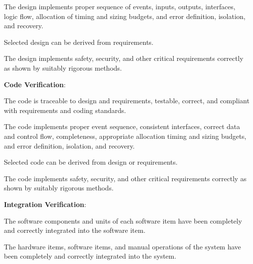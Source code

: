 \begin{adjustwidth}{2em}{0pt}
\begin{compactenum}
\begin{compactenum}
						\item The design implements proper sequence of events, inputs, outputs, interfaces, logic flow, allocation of timing and sizing budgets, and error definition, isolation, and recovery.

						\item Selected design can be derived from requirements.

						\item The design implements safety, security, and other critical requirements correctly as shown by suitably rigorous methods.

					\end{compactenum}

					\item {\bf Code Verification}:

					\begin{compactenum}

						\item The code is traceable to design and requirements, testable, correct, and compliant with requirements and coding standards.

						\item The code implements proper event sequence, consistent interfaces, correct data and control flow, completeness, appropriate allocation timing and sizing budgets, and error definition, isolation, and recovery.

						\item Selected code can be derived from design or requirements.

						\item The code implements safety, security, and other critical requirements correctly as shown by suitably rigorous methods.

					\end{compactenum}

					\item {\bf Integration Verification}:

					\begin{compactenum}

						\item The software components and units of each software item have been completely and correctly integrated into the software item.

						\item The hardware items, software items, and manual operations of the system have been completely and correctly integrated into the system.


\end{compactenum}
\end{compactenum}
\end{adjustwidth}
